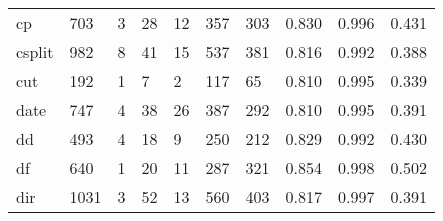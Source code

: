 \begin{longtable}{lp{2.0cm}p{2.0cm}p{2.0cm}p{2.0cm}p{2.0cm}p{2.0cm}p{2.0cm}p{2.0cm}p{2.0cm}}
cp        &                    703 &                                  3 &                                28 &                               12 &                               357 &                             303 &                                   0.830 &                                  0.996 &                                0.431 \\
csplit    &                    982 &                                  8 &                                41 &                               15 &                               537 &                             381 &                                   0.816 &                                  0.992 &                                0.388 \\
cut       &                    192 &                                  1 &                                 7 &                                2 &                               117 &                              65 &                                   0.810 &                                  0.995 &                                0.339 \\
date      &                    747 &                                  4 &                                38 &                               26 &                               387 &                             292 &                                   0.810 &                                  0.995 &                                0.391 \\
dd        &                    493 &                                  4 &                                18 &                                9 &                               250 &                             212 &                                   0.829 &                                  0.992 &                                0.430 \\
df        &                    640 &                                  1 &                                20 &                               11 &                               287 &                             321 &                                   0.854 &                                  0.998 &                                0.502 \\
dir       &                   1031 &                                  3 &                                52 &                               13 &                               560 &                             403 &                                   0.817 &                                  0.997 &                                0.391 \\

\end{longtable}
